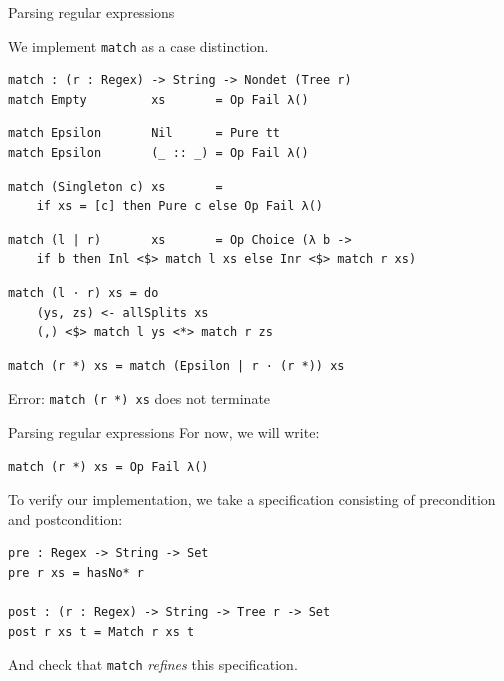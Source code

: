 \documentclass[ignorenonframetext,]{beamer}
\newcommand{\Agda}[1]{\texttt{#1}\xspace}
\newcommand{\match}{\Agda{match}}
\begin{document}
\begin{frame}[fragile]{Parsing regular expressions}

We implement \match as a case distinction.
\begin{verbatim}
match : (r : Regex) -> String -> Nondet (Tree r)
match Empty         xs       = Op Fail λ()
\end{verbatim}
\pause \vspace{-\baselineskip}
\begin{verbatim}
match Epsilon       Nil      = Pure tt
match Epsilon       (_ :: _) = Op Fail λ()
\end{verbatim}
\pause \vspace{-\baselineskip}
\begin{verbatim}
match (Singleton c) xs       =
    if xs = [c] then Pure c else Op Fail λ()
\end{verbatim}
\pause \vspace{-\baselineskip}
\begin{verbatim}
match (l | r)       xs       = Op Choice (λ b ->
    if b then Inl <$> match l xs else Inr <$> match r xs)
\end{verbatim}
\pause \vspace{-\baselineskip}
\begin{verbatim}
match (l · r) xs = do
    (ys, zs) <- allSplits xs
    (,) <$> match l ys <*> match r zs
\end{verbatim}
\pause \vspace{-\baselineskip}
\begin{verbatim}
match (r *) xs = match (Epsilon | r · (r *)) xs
\end{verbatim}
\pause
\alert{Error: \Agda{match (r *) xs} does not terminate}

\end{frame}

\begin{frame}[fragile]{Parsing regular expressions}
For now, we will write:
\begin{verbatim}
match (r *) xs = Op Fail λ()
\end{verbatim}

\pause

To verify our implementation, we take a specification consisting of precondition and postcondition:
\begin{verbatim}
pre : Regex -> String -> Set
pre r xs = hasNo* r

post : (r : Regex) -> String -> Tree r -> Set
post r xs t = Match r xs t
\end{verbatim}

And check that \Agda{match} \emph{refines} this specification.

\end{frame}
\end{document}
